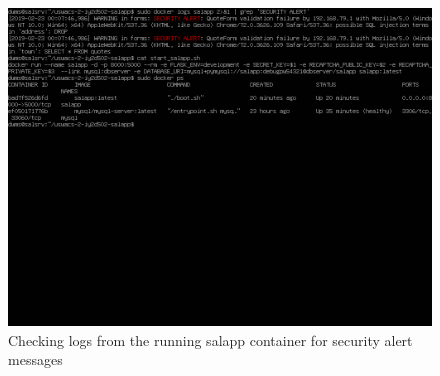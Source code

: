 \pagebreak
\begin{figure}[h!]
\centering
\captionsetup{skip=\skipfigurecaptionlen}
\includegraphics[width=1\textwidth]{screenshots/IY2D502-2019-02-23-00-23-12.png}
\caption{Checking logs from the running salapp container for security alert messages}
\label{fig:IY2D502-2019-02-23-00-23-12}
\end{figure}
\pagebreak
